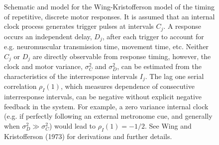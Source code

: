 \documentclass[,dvipsnames]{article}
\DeclareMathOperator{\E}{\mathbb{E}}
\begin{document}
\begin{figure}[ht]
\vspace{-3ex}
\caption{
    \footnotesize
    Schematic and model for the Wing-Kristofferson model of the timing of repetitive, discrete motor responses. It is assumed that an internal clock process generates trigger pulses at intervals $C_j$. A response occurs an independent delay, $D_j$,  after each trigger to account for e.g. neuromuscular transmission time, movement time, etc. Neither $C_j$ or $D_j$ are directly observable from response timing, however, the clock and motor variance, $\sigma_C^2$ and $\sigma_D^2$, can be estimated from the
    characteristics of the interresponse intervals $I_j$. The lag one serial correlation $\rho_I(1)$, which measures dependence of consecutive interresponse intervals, can be negative without explicit negative feedback in the system. For example, a zero variance internal clock (e.g. if perfectly following an external metronome cue, and generally when $\sigma_D^2 \gg \sigma_C^2$) would lead to $\rho_I(1)=-1/2$. See Wing and Kristofferson (1973) for derivations and further
    details.
}
\end{figure}
\end{document}
